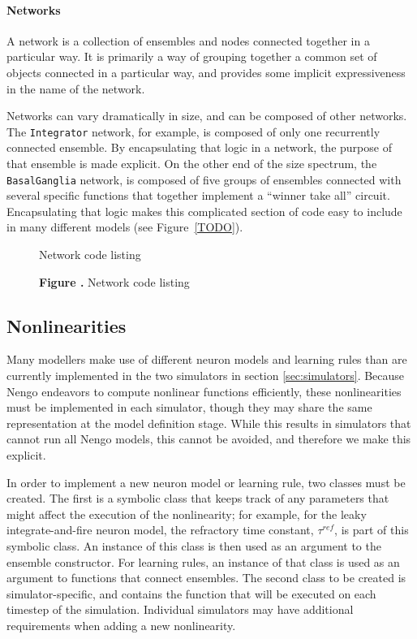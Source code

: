 \documentclass{frontiersSCNS}
\begin{document}
\paragraph{Networks}
A network is a collection of ensembles and nodes
connected together in a particular way.
It is primarily a way of grouping together
a common set of objects connected in a particular way,
and provides some implicit expressiveness
in the name of the network.

Networks can vary dramatically in size,
and can be composed of other networks.
The \texttt{Integrator} network, for example,
is composed of only one recurrently connected ensemble.
By encapsulating that logic in a network,
the purpose of that ensemble is made explicit.
On the other end of the size spectrum,
the \texttt{BasalGanglia} network,
is composed of five groups of ensembles
connected with several specific functions
that together implement a ``winner take all'' circuit.
Encapsulating that logic
makes this complicated section of code
easy to include in many different models
(see Figure~\ref{TODO}).

\begin{figure}
\begin{center}
  Network code listing
\end{center}
 \textbf{\label{fig:01} Figure .}{
   Network code listing}
\end{figure}

\subsection{Nonlinearities}

Many modellers make use of
different neuron models and
learning rules than are
currently implemented
in the two simulators
in section \ref{sec:simulators}.
Because Nengo endeavors
to compute nonlinear functions efficiently,
these nonlinearities
must be implemented in each simulator,
though they may share the same representation
at the model definition stage.
While this results in simulators
that cannot run all Nengo models,
this cannot be avoided,
and therefore we make this explicit.

In order to implement
a new neuron model or learning rule,
two classes must be created.
The first is a symbolic class
that keeps track of any parameters
that might affect the execution
of the nonlinearity;
for example, for
the leaky integrate-and-fire neuron model,
the refractory time constant,
$\tau^{ref}$, is part of this symbolic class.
An instance of this class
is then used as an argument
to the ensemble constructor.
For learning rules,
an instance of that class
is used as an argument
to functions that connect ensembles.
The second class to be created
is simulator-specific,
and contains the function that will be
executed on each timestep of the simulation.
Individual simulators may have additional
requirements when adding
a new nonlinearity.
\end{document}
